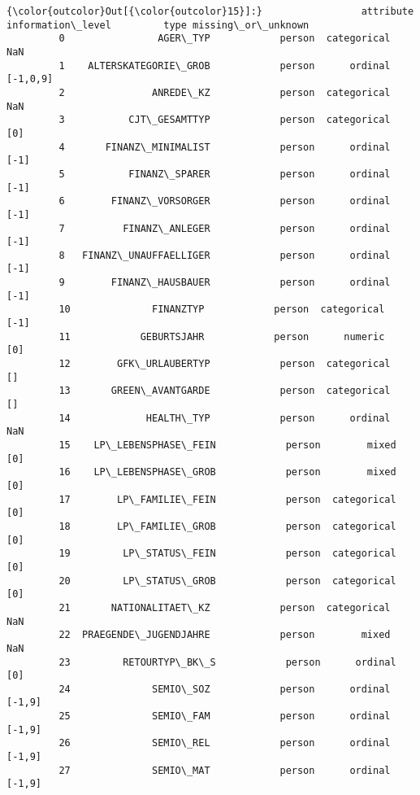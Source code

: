 \documentclass[11pt]{article}
\begin{document}
\begin{Verbatim}[commandchars=\\\{\}]
{\color{outcolor}Out[{\color{outcolor}15}]:}                 attribute information\_level         type missing\_or\_unknown
         0                AGER\_TYP            person  categorical                NaN
         1    ALTERSKATEGORIE\_GROB            person      ordinal           [-1,0,9]
         2               ANREDE\_KZ            person  categorical                NaN
         3           CJT\_GESAMTTYP            person  categorical                [0]
         4       FINANZ\_MINIMALIST            person      ordinal               [-1]
         5           FINANZ\_SPARER            person      ordinal               [-1]
         6        FINANZ\_VORSORGER            person      ordinal               [-1]
         7          FINANZ\_ANLEGER            person      ordinal               [-1]
         8   FINANZ\_UNAUFFAELLIGER            person      ordinal               [-1]
         9        FINANZ\_HAUSBAUER            person      ordinal               [-1]
         10              FINANZTYP            person  categorical               [-1]
         11            GEBURTSJAHR            person      numeric                [0]
         12        GFK\_URLAUBERTYP            person  categorical                 []
         13       GREEN\_AVANTGARDE            person  categorical                 []
         14             HEALTH\_TYP            person      ordinal                NaN
         15    LP\_LEBENSPHASE\_FEIN            person        mixed                [0]
         16    LP\_LEBENSPHASE\_GROB            person        mixed                [0]
         17        LP\_FAMILIE\_FEIN            person  categorical                [0]
         18        LP\_FAMILIE\_GROB            person  categorical                [0]
         19         LP\_STATUS\_FEIN            person  categorical                [0]
         20         LP\_STATUS\_GROB            person  categorical                [0]
         21       NATIONALITAET\_KZ            person  categorical                NaN
         22  PRAEGENDE\_JUGENDJAHRE            person        mixed                NaN
         23         RETOURTYP\_BK\_S            person      ordinal                [0]
         24              SEMIO\_SOZ            person      ordinal             [-1,9]
         25              SEMIO\_FAM            person      ordinal             [-1,9]
         26              SEMIO\_REL            person      ordinal             [-1,9]
         27              SEMIO\_MAT            person      ordinal             [-1,9]

\end{Verbatim}
\end{document}
